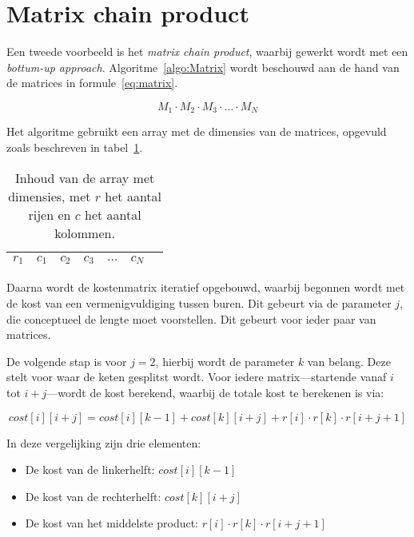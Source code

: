 \section{Matrix chain product}
Een tweede voorbeeld is het \emph{matrix chain product}, waarbij gewerkt wordt met een \emph{bottum-up approach}. 
Algoritme~\ref{algo:Matrix} wordt beschouwd aan de hand van de matrices in formule~\ref{eq:matrix}.

\begin{equation}
    M_1 \cdot M_2 \cdot M_3 \cdot \ldots \cdot M_N
    \label{eq:matrix}
\end{equation}

Het algoritme gebruikt een array met de dimensies van de matrices, opgevuld zoals beschreven in tabel~\ref{table:dimensions}.

%
\begin{table}[!h]
    \centering
    \label{table:dimensions}
    \caption{Inhoud van de array met dimensies, met $r$ het aantal rijen en $c$ het aantal kolommen. }
    \begin{tabular}{|l|l|l|l|l|l|l|}
    \hline
    $r_1$ & $c_1$ & $c_2$ & $c_3$ & $\ldots$ & $c_N$ \\ \hline
    \end{tabular}
\end{table}
%

Daarna wordt de kostenmatrix iteratief opgebouwd, waarbij begonnen wordt met de kost van een vermenigvuldiging tussen buren. 
Dit gebeurt via de parameter $j$, die conceptueel de lengte moet voorstellen. 
Dit gebeurt voor ieder paar van matrices.

De volgende stap is voor $j = 2$, hierbij wordt de parameter $k$ van belang.
Deze stelt voor waar de keten gesplitst wordt. 
Voor iedere matrix---startende vanaf $i$ tot $i + j$---wordt de kost berekend, waarbij de totale kost te berekenen is via: 

\begin{equation}
    cost[i][i+j] = cost[i][k-1]+cost[k][i+j] + r[i] \cdot r[k] \cdot r[i+j+1]
\end{equation}

In deze vergelijking zijn drie elementen:

\begin{itemize}
    \item De kost van de linkerhelft: $cost[i][k-1]$
    \item De kost van de rechterhelft: $cost[k][i+j]$
    \item De kost van het middelste product: $r[i] \cdot r[k] \cdot r[i+j+1]$
\end{itemize}

